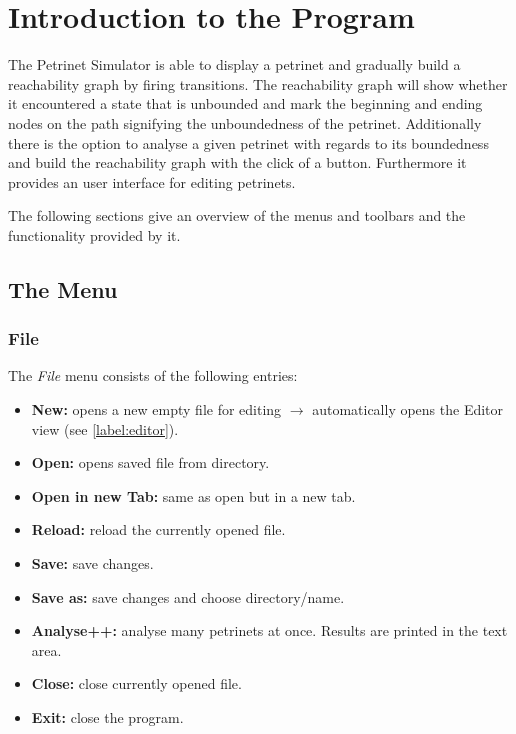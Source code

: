 \documentclass[10pt, a4paper]{article}
\begin{document}
 

\thispagestyle{empty}
\newpage 

\tableofcontents \thispagestyle{plain} \newpage


 \rmfamily \onehalfspace 

\section{Introduction to the Program}

The Petrinet Simulator is able to display a petrinet and gradually build a reachability graph by firing transitions. The reachability graph will show whether it encountered a state that is unbounded and mark the beginning and ending nodes on the path signifying the unboundedness of the petrinet. Additionally there is the option to analyse a given petrinet with regards to its boundedness and build the reachability graph with the click of a button. Furthermore it provides an user interface for editing petrinets. 

The following sections give an overview of the menus and toolbars and the functionality provided by it.

\subsection{The Menu}

\subsubsection{File}
\label{label:file}
The \textit{File} menu consists of the following entries:

\begin{itemize}

\item \textbf{New:} opens a new empty file for editing $\rightarrow$ automatically opens the Editor view (see \ref{label:editor}). 
\item \textbf{Open:} opens saved file from directory.
\item \textbf{Open in new Tab:} same as open but in a new tab.
\item \textbf{Reload:} reload the currently opened file.
\item \textbf{Save:} save changes.
\item \textbf{Save as:} save changes and choose directory/name.
\item \textbf{Analyse++:} analyse many petrinets at once. Results are printed in the text area.
\item \textbf{Close:} close currently opened file.
\item \textbf{Exit:} close the program.

\end{itemize}
\end{document}
